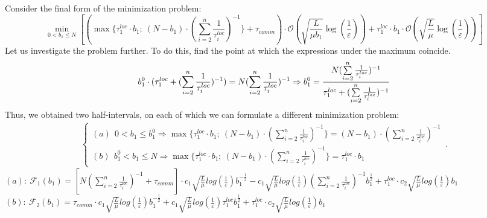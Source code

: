 \documentclass{article}
\begin{document}
Consider the final form of the minimization problem:
\\
\begin{equation}
     \label{eq:fm1}
    \underset{0 < b_1 \leq N}{\min}[(\max\{\tau_1^{loc}\cdot b_1; ~(N-b_1) \cdot (\sum\limits_{i = 2}^{n} \frac{1}{\tau_i^{loc}} )^{-1}\} + \tau_{comm}) \cdot \mathcal O(\sqrt{\frac{L}{\mu b_1}}\log(\frac{1}{\varepsilon})) + \tau_1^{loc}\cdot b_1 \cdot \mathcal O(\sqrt{\frac{L}{\mu}}\log(\frac{1}{\varepsilon}))] 
\end{equation}
Let us investigate the problem further. To do this, find the point at which the expressions under the maximum coincide. 
\begin{equation}
    \notag
    b_1^0 \cdot (\tau_1^{loc} + (\sum\limits_{i = 2}^{n} \frac{1}{\tau_i^{loc}})^{-1}) = N (\sum\limits_{i = 2}^{n} \frac{1}{\tau_i^{loc}})^{-1} \Rightarrow b_1^0 = \frac{N (\sum\limits_{i = 2}^{n} \frac{1}{\tau_i^{loc}})^{-1}}{\tau_1^{loc} + (\sum\limits_{i = 2}^{n} \frac{1}{\tau_i^{loc}})^{-1}}
\end{equation}
Thus, we obtained two half-intervals, on each of which we can formulate a different minimization problem:
\begin{eqnarray}
\label{half-int}
    \begin{cases}
    (a) ~ ~ 0 < b_1 \leq b_1^0 \Rightarrow \max\{\tau_1^{loc}\cdot b_1; ~(N-b_1) \cdot (\sum\limits_{i = 2}^{n} \frac{1}{\tau_i^{loc}} )^{-1}\} = 
    (N-b_1) \cdot (\sum\limits_{i = 2}^{n} \frac{1}{\tau_i^{loc}})^{-1}
    \\
    (b) ~ ~ b_1^0 <  b_1 \leq N \Rightarrow \max\{\tau_1^{loc}\cdot b_1; ~(N-b_1) \cdot (\sum\limits_{i = 2}^{n} \frac{1}{\tau_i^{loc}} )^{-1}\} = \tau_1^{loc}\cdot b_1
    \end{cases}\,.
\end{eqnarray}
$(a): ~\mathcal{F}_1(b_1) = [N (\sum\limits_{i = 2}^{n} \frac{1}{\tau_i^{loc}})^{-1} + \tau_{comm}]\cdot 
c_1 \sqrt{\frac{L}{\mu}}log (\frac{1}{\varepsilon})  b_1^{-\frac{1}{2}} - 
c_1  \sqrt{\frac{L}{\mu}}log (\frac{1}{\varepsilon})(\sum\limits_{i =
2}^{n} \frac{1}{\tau_i^{loc}})^{-1} b_1^{\frac{1}{2}}  + \tau_1^{loc}\cdot c_2  \sqrt{\frac{L}{\mu}}log (\frac{1}{\varepsilon}) b_1 $\\
$(b): ~\mathcal{F}_2(b_1) = \tau_{comm}\cdot 
c_1 \sqrt{\frac{L}{\mu}}log (\frac{1}{\varepsilon})  b_1^{-\frac{1}{2}} + 
c_1  \sqrt{\frac{L}{\mu}}log (\frac{1}{\varepsilon})\tau_1^{loc} b_1^{\frac{1}{2}}  + \tau_1^{loc}\cdot c_2  \sqrt{\frac{L}{\mu}}log (\frac{1}{\varepsilon}) b_1 $\\
\end{document}
